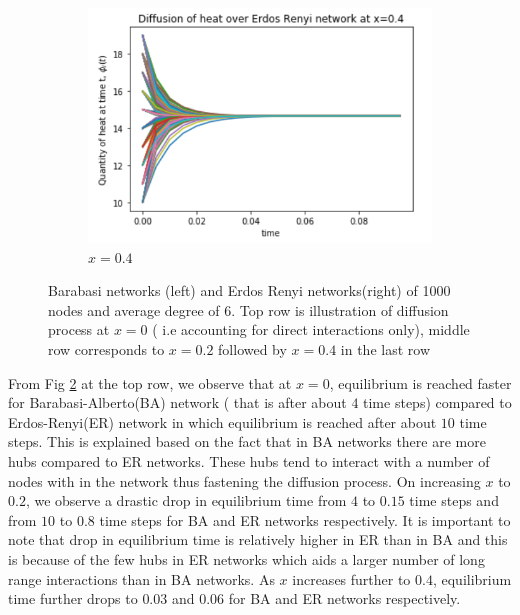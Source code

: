 \documentclass[10pt,a4paper]{article}
\begin{document}
\begin{figure}[H]
\begin{subfigure}[b]{0.45\textwidth}
     		\includegraphics[width= \textwidth]{images/erdos-x04.png}
     		\caption{$x=0.4$}
     		\label{erdos-x04}
     	\end{subfigure}
     	\caption{Barabasi networks (left) and Erdos Renyi networks(right) of 1000 nodes and average degree of 6. Top row is illustration of diffusion process at $x=0$ ( i.e accounting for direct interactions only), middle row corresponds to $x=0.2$ followed by $x=0.4$ in the last row}
     	\label{barabasi-Erdos-compare}
     \end{figure}
     
     From Fig \ref{barabasi-Erdos-compare} at the top row, we observe that at $x=0$, equilibrium is reached faster for Barabasi-Alberto(BA) network ( that is after about $4$ time steps) compared to Erdos-Renyi(ER) network in which equilibrium is reached after about $10$ time steps. This is explained based on the fact that in BA networks there are more hubs compared to ER networks. These hubs tend to interact with a number of nodes with in the network thus fastening the diffusion process. On increasing $x$ to $0.2$, we observe a drastic drop in equilibrium time from  $4$ to $0.15$ time steps and from $10$ to $0.8$ time steps for BA and ER networks respectively. It is important to note that drop in equilibrium time is relatively higher in ER than in BA and this is because of the few hubs in ER networks which aids a larger number of long range interactions than in BA networks. As $x$ increases further to $0.4$, equilibrium time further drops to $0.03$ and $0.06$ for BA and ER networks respectively.
     
\end{document}
